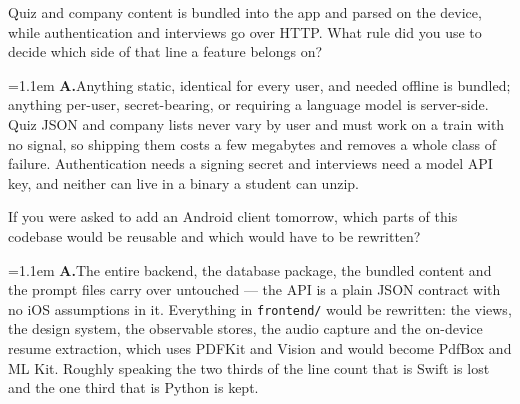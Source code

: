 \documentclass[11pt,a4paper]{article}
\newcommand{\code}[1]{\texttt{\small #1}}
\newcommand{\ans}[1]{%
  \par\vspace{0.32em}%
  \begingroup
  \small\color{answerink}%
  \leftskip=1.1em
  \noindent\textbf{\color{accent}A.}\hspace{0.45em}#1\par
  \endgroup
  \vspace{0.1em}%
}
\begin{document}
\begin{questions}
\item Quiz and company content is bundled into the app and parsed on the device,
while authentication and interviews go over HTTP. What rule did you use to decide
which side of that line a feature belongs on?
\ans{Anything static, identical for every user, and needed offline is bundled;
anything per-user, secret-bearing, or requiring a language model is server-side.
Quiz JSON and company lists never vary by user and must work on a train with no
signal, so shipping them costs a few megabytes and removes a whole class of
failure. Authentication needs a signing secret and interviews need a model API
key, and neither can live in a binary a student can unzip.}

\item If you were asked to add an Android client tomorrow, which parts of this
codebase would be reusable and which would have to be rewritten?
\ans{The entire backend, the database package, the bundled content and the prompt
files carry over untouched --- the API is a plain JSON contract with no iOS
assumptions in it. Everything in \code{frontend/} would be rewritten: the views,
the design system, the observable stores, the audio capture and the on-device
resume extraction, which uses PDFKit and Vision and would become PdfBox and ML
Kit. Roughly speaking the two thirds of the line count that is Swift is lost and
the one third that is Python is kept.}

\end{questions}
\end{document}
